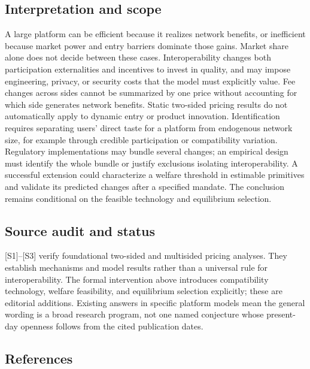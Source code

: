 \documentclass[11pt,a4paper]{article}
\begin{document}
\subsection*{Interpretation and scope}

A large platform can be efficient because it realizes network benefits, or inefficient because market power and entry barriers dominate those gains. Market share alone does not decide between these cases. Interoperability changes both participation externalities and incentives to invest in quality, and may impose engineering, privacy, or security costs that the model must explicitly value. Fee changes across sides cannot be summarized by one price without accounting for which side generates network benefits. Static two-sided pricing results do not automatically apply to dynamic entry or product innovation. Identification requires separating users' direct taste for a platform from endogenous network size, for example through credible participation or compatibility variation. Regulatory implementations may bundle several changes; an empirical design must identify the whole bundle or justify exclusions isolating interoperability. A successful extension could characterize a welfare threshold in estimable primitives and validate its predicted changes after a specified mandate. The conclusion remains conditional on the feasible technology and equilibrium selection.

\subsection*{Source audit and status}

[S1]--[S3] verify foundational two-sided and multisided pricing analyses. They establish mechanisms and model results rather than a universal rule for interoperability. The formal intervention above introduces compatibility technology, welfare feasibility, and equilibrium selection explicitly; these are editorial additions. Existing answers in specific platform models mean the general wording is a broad research program, not one named conjecture whose present-day openness follows from the cited publication dates.

\subsection*{References}
\end{document}
